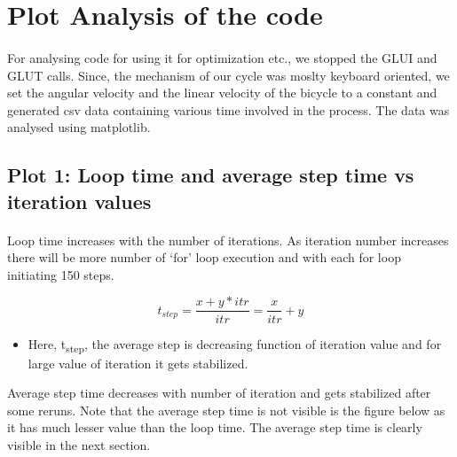 \documentclass[11pt]{article}
\begin{document}
\section{Plot Analysis of the code}
\paragraph{}
	
	For analysing code for using it for optimization etc., we stopped the GLUI and GLUT calls.
	Since, the mechanism of our cycle was moslty keyboard oriented, we set the angular velocity and the linear velocity 
	of the bicycle to a constant and generated csv data containing various time involved in the process.
	The data was analysed using matplotlib\cite{mat}.
	
	

\subsection{Plot 1: Loop time and average step time vs iteration values}
\paragraph{}

	Loop time increases with the number of iterations. As iteration number increases there will be more 
	number of ‘for’ loop execution and with each for loop initiating 150 steps. 
	
	\begin{equation}
		t_{step} = \frac {x + y*itr}{itr} = \frac{x}{itr} + y
	\end{equation}


	\begin{itemize}
	\item Here, t\textsubscript{step}, the average step is decreasing function of iteration value and for 
	large value of iteration it gets stabilized.
	\end{itemize}

	Average step time decreases with number of iteration and gets stabilized after some reruns.
	Note that the average step time is not visible is the figure below as it has much lesser value than the 
	loop time. The average step time is clearly visible in the next section.
\end{document}
